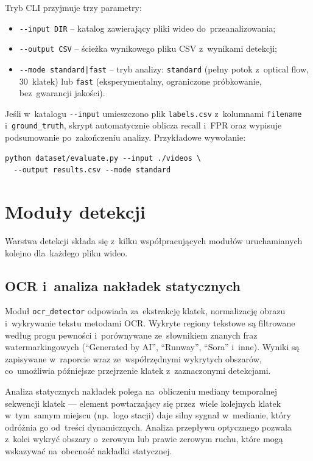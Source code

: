Tryb CLI przyjmuje trzy parametry:
\begin{itemize}
  \item \texttt{-{}-input DIR} -- katalog zawierający pliki wideo do~przeanalizowania;
  \item \texttt{-{}-output CSV} -- ścieżka wynikowego pliku CSV z~wynikami detekcji;
  \item \texttt{-{}-mode standard|fast} -- tryb analizy: \texttt{standard} (pełny
    potok z~optical flow, 30~klatek) lub \texttt{fast} (eksperymentalny, ograniczone
    próbkowanie, bez~gwarancji jakości).
\end{itemize}

Jeśli w~katalogu \texttt{-{}-input} umieszczono plik \texttt{labels.csv}
z~kolumnami \texttt{filename} i~\texttt{ground\_truth}, skrypt automatycznie
oblicza recall i~FPR oraz wypisuje podsumowanie po~zakończeniu analizy.
Przykładowe wywołanie:

\begin{verbatim}
python dataset/evaluate.py --input ./videos \
  --output results.csv --mode standard
\end{verbatim}



\section{Moduły detekcji}

Warstwa detekcji składa się z~kilku współpracujących modułów
uruchamianych kolejno dla~każdego pliku wideo.

\subsection*{OCR i~analiza nakładek statycznych}

Moduł \texttt{ocr\_detector} odpowiada za~ekstrakcję klatek, normalizację obrazu
i~wykrywanie tekstu metodami OCR. Wykryte regiony tekstowe są filtrowane według
progu pewności i~porównywane ze~słownikiem znanych fraz watermarkingowych
(\enquote{Generated by AI}, \enquote{Runway}, \enquote{Sora} i~inne).
Wyniki są zapisywane w~raporcie wraz ze~współrzędnymi wykrytych obszarów,
co~umożliwia późniejsze przejrzenie klatek z~zaznaczonymi detekcjami.

Analiza statycznych nakładek polega na~obliczeniu mediany temporalnej sekwencji klatek
--- element powtarzający się przez~wiele kolejnych klatek w~tym~samym miejscu
(np.\ logo stacji) daje silny sygnał w~medianie, który odróżnia go
od~treści dynamicznych. Analiza przepływu optycznego pozwala z~kolei wykryć
obszary o~zerowym lub prawie zerowym ruchu, które mogą wskazywać
na~obecność nakładki statycznej.


